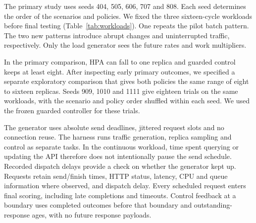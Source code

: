 \documentclass[10pt,twocolumn,a4paper]{article}
\begin{document}
The primary study uses seeds 404, 505, 606, 707 and 808. Each seed determines the order of the scenarios and policies. We fixed the three sixteen-cycle workloads before final testing (Table~\ref{tab:workloads}). One repeats the pilot batch pattern. The two new patterns introduce abrupt changes and uninterrupted traffic, respectively. Only the load generator sees the future rates and work multipliers.

In the primary comparison, HPA can fall to one replica and guarded control keeps at least eight. After inspecting early primary outcomes, we specified a separate exploratory comparison that gives both policies the same range of eight to sixteen replicas. Seeds 909, 1010 and 1111 give eighteen trials on the same workloads, with the scenario and policy order shuffled within each seed. We used the frozen guarded controller for these trials.


\begin{table}[t]\centering\small\setlength{\tabcolsep}{3pt}
\caption{Each cycle spans eight seconds. Batch workloads offer traffic for five seconds and pause for three; continuous traffic uses all eight. Work multipliers rise to 1.8 in cycles 13--16 of the previous batch, to 1.6 in cycles 11--13 of abrupt batch, and to 1.6 in cycles 11--16 of continuous traffic. Other cycles use unit work.}\label{tab:workloads}
\ifdim\wd\databox>\textwidth\relax\resizebox{\textwidth}{!}{\usebox{\databox}}\else\usebox{\databox}\fi
\end{table}


The generator uses absolute send deadlines, jittered request slots and no connection reuse. The harness runs traffic generation, replica sampling and control as separate tasks. In the continuous workload, time spent querying or updating the API therefore does not intentionally pause the send schedule. Recorded dispatch delays provide a check on whether the generator kept up. Requests retain send/finish times, HTTP status, latency, CPU and queue information where observed, and dispatch delay. Every scheduled request enters final scoring, including late completions and timeouts. Control feedback at a boundary uses completed outcomes before that boundary and outstanding-response ages, with no future response payloads.
\end{document}
